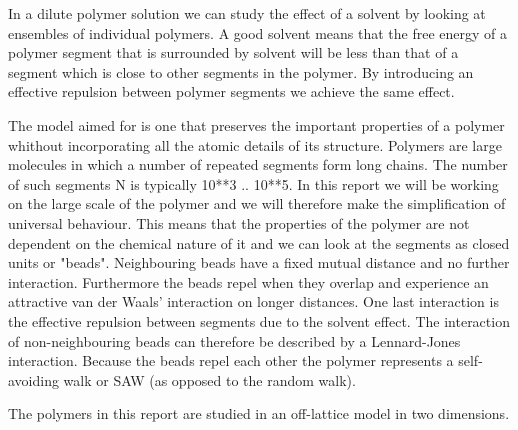In a dilute polymer solution we can study the effect of a solvent by looking at ensembles of individual polymers. A good solvent means that the free energy of a polymer segment that is surrounded by solvent will be less than that of a segment which is close to other segments in the polymer. By introducing an effective repulsion between polymer segments we achieve the same effect.

The model aimed for is one that preserves the important properties of a polymer whithout incorporating all the atomic details of its structure. Polymers are large molecules in which a number of repeated segments form long chains. The number of such segments N is typically 10**3 .. 10**5. In this report we will be working on the large scale of the polymer and we will therefore make the simplification of universal behaviour. This means that the properties of the polymer are not dependent on the chemical nature of it and we can look at the segments as closed units or "beads". Neighbouring beads have a fixed mutual distance and no further interaction. Furthermore the beads repel when they overlap and experience an attractive van der Waals' interaction on longer distances. One last interaction is the effective repulsion between segments due to the solvent effect. The interaction of non-neighbouring beads can therefore be described by a Lennard-Jones interaction. Because the beads repel each other the polymer represents a self-avoiding walk or SAW (as opposed to the random walk).

The polymers in this report are studied in an off-lattice model in two dimensions.